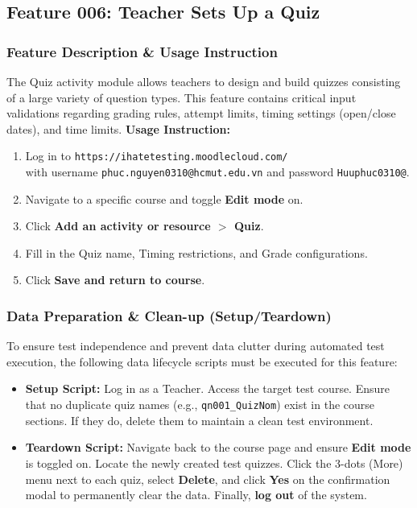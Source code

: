 \documentclass[twoside,final]{hcmut-report}
\begin{document}
\subsection{Feature 006: Teacher Sets Up a Quiz}

\subsubsection{Feature Description \& Usage Instruction}
The Quiz activity module allows teachers to design and build quizzes consisting of a large variety of question types. This feature contains critical input validations regarding grading rules, attempt limits, timing settings (open/close dates), and time limits.
\newline
\textbf{Usage Instruction:}
\begin{enumerate}
    \item Log in to \texttt{https://ihatetesting.moodlecloud.com/}\\ with username \texttt{phuc.nguyen0310@hcmut.edu.vn} and password \texttt{Huuphuc0310@}.
    \item Navigate to a specific course and toggle \textbf{Edit mode} on.
    \item Click \textbf{Add an activity or resource $>$ Quiz}.
    \item Fill in the Quiz name, Timing restrictions, and Grade configurations.
    \item Click \textbf{Save and return to course}.
\end{enumerate}

\subsubsection{Data Preparation \& Clean-up (Setup/Teardown)}
To ensure test independence and prevent data clutter during automated test execution, the following data lifecycle scripts must be executed for this feature:
\begin{itemize}
    \item \textbf{Setup Script:} Log in as a Teacher. Access the target test course. Ensure that no duplicate quiz names (e.g., \texttt{qn001\_QuizNom}) exist in the course sections. If they do, delete them to maintain a clean test environment.
    \item \textbf{Teardown Script:} Navigate back to the course page and ensure \textbf{Edit mode} is toggled on. Locate the newly created test quizzes. Click the 3-dots (More) menu next to each quiz, select \textbf{Delete}, and click \textbf{Yes} on the confirmation modal to permanently clear the data. Finally, \textbf{log out} of the system.
\end{itemize}
\end{document}
